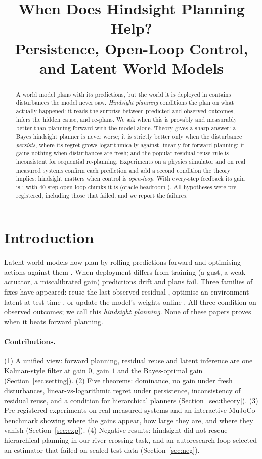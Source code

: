 \documentclass[11pt]{article}
\title{When Does Hindsight Planning Help?\\Persistence, Open-Loop Control, and Latent World Models}
\author{\todo{authors}}
\date{}
\begin{document}
\maketitle

\begin{abstract}
A world model plans with its predictions, but the world it is deployed in contains disturbances the model never saw.
\emph{Hindsight planning} conditions the plan on what actually happened: it reads the surprise between predicted and
observed outcomes, infers the hidden cause, and re-plans. We ask when this is provably and measurably better than
planning forward with the model alone. Theory gives a sharp answer: a Bayes hindsight planner is never worse; it is
strictly better only when the disturbance \emph{persists}, where its regret grows logarithmically against linearly for
forward planning; it gains nothing when disturbances are fresh; and the popular residual-reuse rule is inconsistent for
sequential re-planning. Experiments on a physics simulator and on real measured systems confirm each prediction and add
a second condition the theory implies: hindsight matters when control is \emph{open-loop}. With every-step feedback its
gain is \ksGainOne; with 40-step open-loop chunks it is \ksGainForty{} (oracle headroom \ksHeadForty). All hypotheses
were pre-registered, including those that failed, and we report the failures.
\end{abstract}

\section{Introduction}
Latent world models now plan by rolling predictions forward and optimising actions against them
\citep{cwm_2611_24778,adajepa_2606_32026,t2z_2610_22364}. When deployment differs from training (a gust, a weak
actuator, a miscalibrated gain) predictions drift and plans fail. Three families of fixes have appeared: reuse the
last observed residual \citep{cwm_2611_24778}, optimise an environment latent at test time \citep{t2z_2610_22364}, or
update the model's weights online \citep{adajepa_2606_32026}. All three condition on observed outcomes; we call this
\emph{hindsight planning}. None of these papers proves when it beats forward planning.

\paragraph{Contributions.}
(1) A unified view: forward planning, residual reuse and latent inference are one Kalman-style filter at gain $0$,
gain $1$ and the Bayes-optimal gain (Section~\ref{sec:setting}).
(2) Five theorems: dominance, no gain under fresh disturbances, linear-vs-logarithmic regret under persistence,
inconsistency of residual reuse, and a condition for hierarchical planners (Section~\ref{sec:theory}).
(3) Pre-registered experiments on real measured systems and an interactive MuJoCo benchmark showing where the gains
appear, how large they are, and where they vanish (Section~\ref{sec:exp}).
(4) Negative results: hindsight did not rescue hierarchical planning in our river-crossing task, and an autoresearch
loop selected an estimator that failed on sealed test data (Section~\ref{sec:neg}).
\end{document}
